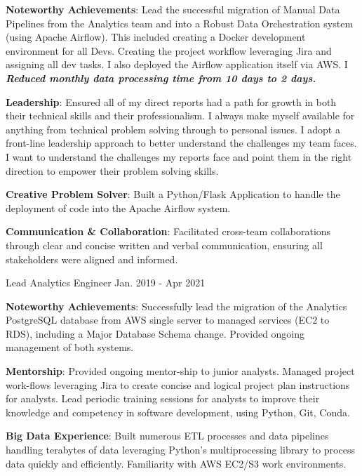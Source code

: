 \begin{cventries}
    {
      \begin{cvitems}
          \item {\textbf{Noteworthy Achievements}: Lead the successful migration of Manual Data Pipelines from the Analytics team and into a Robust Data Orchestration system (using Apache Airflow). This included creating a Docker development environment for all Devs. Creating the project workflow leveraging Jira and assigning all dev tasks. I also deployed the Airflow application itself via AWS. I \textbf{\emph{Reduced monthly data processing time from 10 days to 2 days.}}
          \item {\textbf{Leadership}: Ensured all of my direct reports had a path for growth in both their technical skills and their professionalism. I always make myself available for anything from technical problem solving through to personal issues. I adopt a front-line leadership approach to better understand the challenges my team faces. I want to understand the challenges my reports face and point them in the right direction to empower their problem solving skills.}
          \item {\textbf{Creative Problem Solver}: Built a Python/Flask Application to handle the deployment of code into the Apache Airflow system.}
          \item {\textbf{Communication \& Collaboration}}: Facilitated cross-team collaborations through clear and concise written and verbal communication, ensuring all stakeholders were aligned and informed.}
      \end{cvitems}
    }
  \cventry
    {Lead Analytics Engineer}
    {}
    {}
    {Jan. 2019 - Apr 2021}
    {
      \begin{cvitems}
          \item {\textbf{Noteworthy Achievements}: Successfully lead the migration of the Analytics PostgreSQL database from AWS single server to managed services (EC2 to RDS), including a Major Database Schema change. Provided ongoing management of both systems.}
          \item {\textbf{Mentorship}: Provided ongoing mentor-ship to junior analysts. Managed project work-flows leveraging Jira to create concise and logical project plan instructions for analysts. Lead periodic training sessions for analysts to improve their knowledge and competency in software development, using Python, Git, Conda.}
          \item {\textbf{Big Data Experience}: Built numerous ETL processes and data pipelines handling terabytes of data leveraging Python's multiprocessing library to process data quickly and efficiently. Familiarity with AWS EC2/S3 work environments.}          

\end{cvitems}}
\end{cventries}
